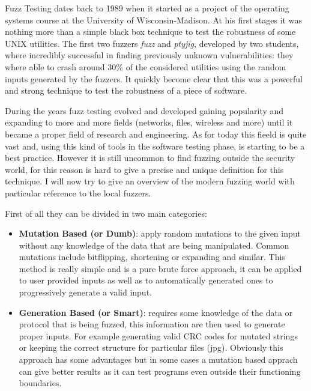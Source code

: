 \documentclass[../main.tex]{subfiles}
\begin{document}
Fuzz Testing dates back to 1989 when it started as a project of the operating
systems course at the University of Wisconsin-Madison. At his first stages it
was nothing more than a simple black box technique to test the robustness of
some UNIX utilities. The first two fuzzers \textit{fuzz} and \textit{ptyjig},
developed by two students, where incredibly successful in finding previously
unknown vulnerabilities: they where able to crash around 30\% of the considered
utilities using the random inputs generated by the fuzzers\cite{firstFuzzPaper}.
It quickly become clear that this was a powerful and strong technique to test
the robustness of a piece of software.

During the years fuzz testing evolved and developed gaining popularity and
expanding to more and more fields (networks, files, wireless and more) until it
became a proper field of research and engineering. As for today this fieeld is
quite vast and, using this kind of tools in the software testing phase, is
starting to be a best practice. However it is still uncommon to find fuzzing
outside the security world, for this reason is hard to give a precise and unique
definition for this technique. I will now try to give an overview of the modern
fuzzing world with particular reference to the local fuzzers. %

First of all they can be divided in two main categories:

\begin{itemize}
  \item{\textbf{Mutation Based (or Dumb)}: apply random mutations to the given
  input without any knowledge of the data that are being manipulated. Common
  mutations include bitflipping, shortening or expanding and similar. This
  method is really simple and is a pure brute force approach, it can be applied
  to user provided inputs as well as to automatically generated ones to
  progressively generate a valid input.}

  \item{\textbf{Generation Based (or Smart)}: requires some knowledge of the
  data or protocol that is being fuzzed, this information are then used to
  generate proper inputs. For example generating valid CRC codes for mutated
  strings or keeping the correct structure for particular files (jpg). Obviously this approach has some advantages but in some cases a mutation based apprach can give better results as it can test programs even outside their functioning boundaries.} %

\end{itemize}
\end{document}
